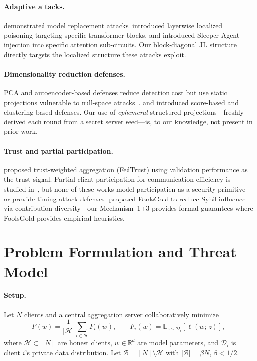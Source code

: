 \documentclass{article}
\newcommand{\R}{\mathbb{R}}
\newcommand{\E}{\mathbb{E}}
\newcommand{\calH}{\mathcal{H}}      %
\newcommand{\calB}{\mathcal{B}}      %
\begin{document}
\paragraph{Adaptive attacks.}
\citet{bagdasaryan2020backdoor} demonstrated model replacement attacks.
\citet{guo2021gradient} introduced layerwise localized poisoning targeting
specific transformer blocks.
\citet{shumailov2023manipulating} and \citet{hammoud2024sleeper} introduced
Sleeper Agent injection into specific attention sub-circuits.
Our block-diagonal JL structure directly targets the localized structure these
attacks exploit.

\paragraph{Dimensionality reduction defenses.}
PCA and autoencoder-based defenses reduce detection cost but use static
projections vulnerable to null-space attacks~\citep{li2021sapag}.
\citet{xie2021flcert} and \citet{nguyen2022flame} introduced score-based and
clustering-based defenses.
Our use of \emph{ephemeral} structured projections---freshly derived each round
from a secret server seed---is, to our knowledge, not present in prior work.

\paragraph{Trust and partial participation.}
\citet{kang2019incentive} proposed trust-weighted aggregation (FedTrust) using
validation performance as the trust signal.
Partial client participation for communication efficiency is studied
in~\citet{mcmahan2017communication, li2020federated, karimireddy2020scaffold},
but none of these works model participation as a security primitive or provide
timing-attack defenses.
\citet{fung2018mitigating} proposed FoolsGold to reduce Sybil influence via
contribution diversity---our Mechanism~1+3 provides formal guarantees where
FoolsGold provides empirical heuristics.

\section{Problem Formulation and Threat Model}
\label{sec:problem}

\paragraph{Setup.}
Let $N$ clients and a central aggregation server collaboratively minimize
\[
  F(w) = \frac{1}{|\calH|} \sum_{i \in \calH} F_i(w), \qquad
  F_i(w) = \E_{z \sim \mathcal{D}_i}[\ell(w;\, z)],
\]
where $\calH \subset [N]$ are honest clients, $w \in \R^d$ are model
parameters, and $\mathcal{D}_i$ is client $i$'s private data distribution.
Let $\calB = [N] \setminus \calH$ with $|\calB| = \beta N$, $\beta < 1/2$.
\end{document}
